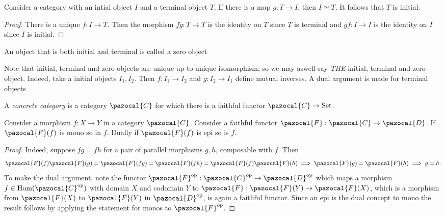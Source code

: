     \begin{proposition}
        Consider a category with an intial object $I$ and a terminal object $T$. If there is a map $g: T\rightarrow I$, then $I\simeq T$. It follows that $T$ is initial.
    \end{proposition}
    \begin{proof}
        There is a unique $f: I \rightarrow T$. Then the morphism $fg : T\rightarrow T$ is the identity on $T$ since $T$ is terminal and $gf : I\rightarrow I$ is the identity on $I$ since $I$ is initial.
    \end{proof}
    \begin{definition}
        An object that is both initial and terminal is called a zero object
    \end{definition}
    \begin{remark}
        Note that initial, terminal and zero objects are unique up to unique isomorphism, so we may aswell say \emph{THE} initial, terminal and zero object. Indeed, take a initial objects $I_1,I_2$. Then $f: I_1\rightarrow I_2$ and $g: I_2 \rightarrow I_1$ define mutual inverses. A dual argument is made for terminal objects
    \end{remark}
    \begin{definition}
        A \emph{concrete category} is a category $\pazocal{C}$ for which there is a faithful functor $\pazocal{C} \rightarrow \mathrm{Set}$.
    \end{definition}
    \begin{proposition}
        Consider a morphism $f: X\rightarrow Y$ in a category $\pazocal{C}$. Consider a faithful functor $\pazocal{F} : \pazocal{C}\rightarrow \pazocal{D}$. If $\pazocal{F}(f)$ is mono so in $f$. Dually if $\pazocal{F}(f)$ is epi so is $f$.
    \end{proposition}
    \begin{proof}
        Indeed, suppose $fg = fh$ for a pair of parallel morphisms $g,h$, composable with $f$. Then 
        $$\pazocal{F}(f)\pazocal{F}(g)= \pazocal{F}(fg) =\pazocal{F}(fh)  = \pazocal{F}(f)\pazocal{F}(h) \implies \pazocal{F}(g) = \pazocal{F}(h) \implies g=h.$$ 
        To make the dual argument, note the functor $\pazocal{F}\op : \pazocal{C}\op \rightarrow \pazocal{D}\op$ which maps a morphism $f\in \Hom(\pazocal{C}\op)$ with domain $X$ and codomain $Y$ to $\pazocal{F}: \pazocal{F}(Y) \rightarrow \pazocal{F}(X)$, which is a morphism from $\pazocal{F}(X)$ to $\pazocal{F}(Y)$ in $\pazocal{D}\op$, is again a faithful functor. Since an epi is the dual concept to mono the result follows by applying the statement for monos to $\pazocal{F}\op$.   
    \end{proof}
